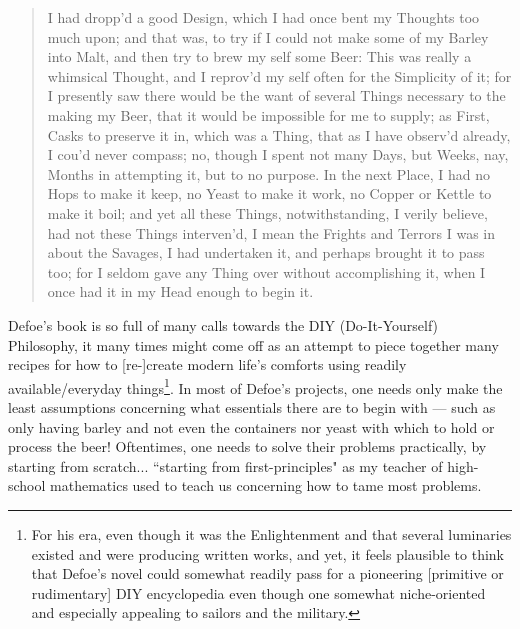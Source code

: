 \documentclass[a4paper]{article}
\begin{document}
\noindent
\begin{minipage}{1\textwidth}
\vspace{1em}
\begin{quotation}
{\ttfamily

I had dropp’d a good Design, which I had once bent my Thoughts too much upon; and that was, to try if I could not make some of my Barley into Malt, and then try to brew my self some Beer: This was really a whimsical Thought, and I reprov’d my self often for the Simplicity of it; for I presently saw there would be the want of several Things necessary to the making my Beer, that it would be impossible for me to supply; as First, Casks to preserve it in, which was a Thing, that as I have observ’d already, I cou’d never compass; no, though I spent not many Days, but Weeks, nay, Months in attempting it, but to no purpose. In the next Place, I had no Hops to make it keep, no Yeast to make it work, no Copper or Kettle to make it boil; and yet all these Things, notwithstanding, I verily believe, had not these Things interven’d, I mean the Frights and Terrors I was in about the Savages, I had undertaken it, and perhaps brought it to pass too; for I seldom gave any Thing over without accomplishing it, when I once had it in my Head enough to begin it.


}
\end{quotation}
\vspace{1em}
\end{minipage}



Defoe's book is so full of many calls towards the DIY (Do-It-Yourself) Philosophy, it many times might come off as an attempt to piece together many recipes for how to [re-]create modern life's comforts using readily available/everyday things\footnote{For his era, even though it was the Enlightenment and that several luminaries existed and were producing written works, and yet, it feels plausible to think that Defoe's novel could somewhat readily pass for a pioneering [primitive or rudimentary] DIY encyclopedia even though one somewhat niche-oriented and especially appealing to sailors and the military.}. In most of Defoe's projects, one needs only make the least assumptions concerning what essentials there are to begin with --- such as only having barley and not even the containers nor yeast with which to hold or process the beer! Oftentimes, one needs to solve their problems practically, by starting from scratch... ``starting from first-principles" as my teacher of high-school mathematics used to teach us concerning how to tame most problems.
\end{document}
